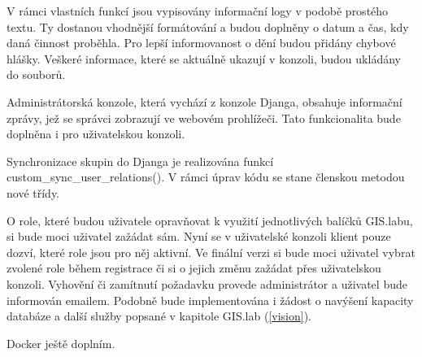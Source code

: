 V rámci vlastních funkcí jsou vypisovány informační logy v podobě
prostého textu. Ty dostanou vhodnější formátování a budou doplněny o
datum a čas, kdy daná činnost proběhla. Pro lepší informovanost o dění
budou přidány chybové hlášky. Veškeré informace, které se aktuálně
ukazují v konzoli, budou ukládány do souborů.

Administrátorská konzole, která vychází z konzole Djanga, obsahuje
informační zprávy, jež se správci zobrazují ve webovém
prohlížeči. Tato funkcionalita bude doplněna i pro uživatelskou
konzoli.

Synchronizace skupin do Djanga je realizována funkcí
\textsf{custom\_sync\_user\_relations()}. V rámci úprav kódu se stane
členskou metodou nové třídy.

O role, které budou uživatele opravňovat k využití jednotlivých
balíčků GIS.labu, si bude moci uživatel zažádat sám. Nyní se v
uživatelské konzoli klient pouze dozví, které role jsou pro něj
aktivní. Ve finální verzi si bude moci uživatel vybrat zvolené role
během registrace či si o jejich změnu zažádat přes uživatelskou
konzoli. Vyhovění či zamítnutí požadavku provede administrátor a
uživatel bude informován emailem. Podobně bude implementována i žádost
o navýšení kapacity databáze a další služby popsané v kapitole GIS.lab
(\ref{vision}).

Docker ještě doplním.
